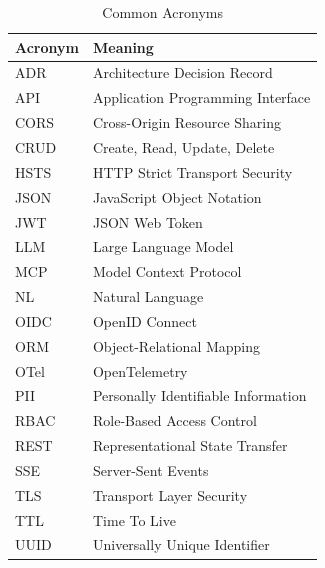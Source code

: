 \documentclass[a4paper,twoside]{sapthesis}
\begin{document}
\begin{table}[ht]
\centering
\caption{Common Acronyms}
\label{tab:acronyms}
\small
\begin{tabularx}{\textwidth}{lX}
    \hline
    \textbf{Acronym} & \textbf{Meaning} \\
    \hline
    ADR & Architecture Decision Record \\
    API & Application Programming Interface \\
    CORS & Cross-Origin Resource Sharing \\
    CRUD & Create, Read, Update, Delete \\
    HSTS & HTTP Strict Transport Security \\
    JSON & JavaScript Object Notation \\
    JWT & JSON Web Token \\
    LLM & Large Language Model \\
    MCP & Model Context Protocol \\
    NL & Natural Language \\
    OIDC & OpenID Connect \\
    ORM & Object-Relational Mapping \\
    OTel & OpenTelemetry \\
    PII & Personally Identifiable Information \\
    RBAC & Role-Based Access Control \\
    REST & Representational State Transfer \\
    SSE & Server-Sent Events \\
    TLS & Transport Layer Security \\
    TTL & Time To Live \\
    UUID & Universally Unique Identifier \\
    \hline
\end{tabularx}
\end{table}



\backmatter

\end{document}
